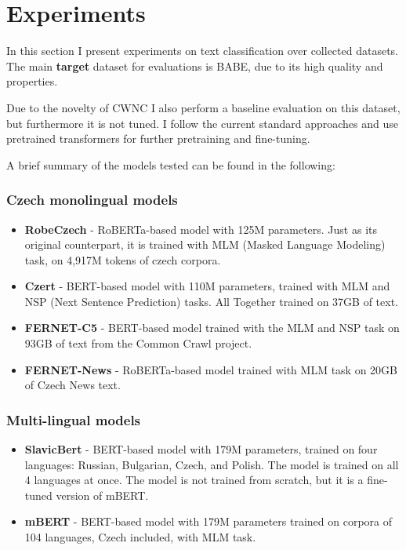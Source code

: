 \chapter{Experiments}\label{experiments}
In this section I present experiments on text classification over collected datasets. The main \textbf{target} dataset for evaluations is BABE, due to its high quality and properties.

Due to the novelty of CWNC I also perform a baseline evaluation on this dataset, but furthermore it is not tuned.
I follow the current standard approaches and use pretrained transformers for further pretraining and fine-tuning. 

A brief summary of the models tested can be found in the following:




\subsection{Czech monolingual models}
\begin{itemize}
    \item \textbf{RobeCzech} \cite{strakarobeczech} - RoBERTa-based model with 125M parameters. Just as its original counterpart, it is trained with MLM (Masked Language Modeling) task, on 4,917M tokens of czech corpora.
    \item \textbf{Czert} \cite{sido-etal-2021-czert} - BERT-based model with 110M parameters, trained with MLM and NSP (Next Sentence Prediction) tasks. All Together trained on 37GB of text. 
    \item \textbf{FERNET-C5} \cite{lehevcka2021comparison} - BERT-based model trained with the MLM and NSP task on 93GB of text from the Common Crawl project.
    \item \textbf{FERNET-News} \cite{lehevcka2021comparison} - RoBERTa-based model trained with MLM task on 20GB of Czech News text.
\end{itemize}






\subsection{Multi-lingual models}
\begin{itemize}
    \item \textbf{SlavicBert} \cite{arkhipov2019tuning} - BERT-based model with 179M parameters, trained on four languages: Russian, Bulgarian, Czech, and Polish. The model is trained on all 4 languages at once. The model is not trained from scratch, but it is a fine-tuned version of mBERT.
    \item \textbf{mBERT} - BERT-based model with 179M parameters trained on corpora of 104 languages, Czech included, with MLM task.
\end{itemize}


